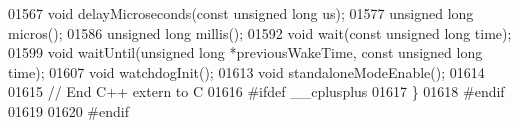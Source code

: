 \begin{DoxyCode}
01567 \textcolor{keywordtype}{void} delayMicroseconds(\textcolor{keyword}{const} \textcolor{keywordtype}{unsigned} \textcolor{keywordtype}{long} us);
01577 \textcolor{keywordtype}{unsigned} \textcolor{keywordtype}{long} micros();
01586 \textcolor{keywordtype}{unsigned} \textcolor{keywordtype}{long} millis();
01592 \textcolor{keywordtype}{void} wait(\textcolor{keyword}{const} \textcolor{keywordtype}{unsigned} \textcolor{keywordtype}{long} time);
01599 \textcolor{keywordtype}{void} waitUntil(\textcolor{keywordtype}{unsigned} \textcolor{keywordtype}{long} *previousWakeTime, \textcolor{keyword}{const} \textcolor{keywordtype}{unsigned} \textcolor{keywordtype}{long} time);
01607 \textcolor{keywordtype}{void} watchdogInit();
01613 \textcolor{keywordtype}{void} standaloneModeEnable();
01614 
01615 \textcolor{comment}{// End C++ extern to C}
01616 \textcolor{preprocessor}{#ifdef \_\_cplusplus}
01617 \}
01618 \textcolor{preprocessor}{#endif}
01619 
01620 \textcolor{preprocessor}{#endif}
\end{DoxyCode}
